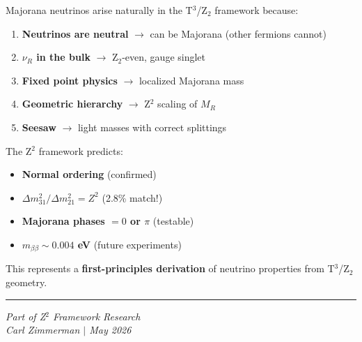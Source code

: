 \documentclass[12pt,a4paper]{article}
\begin{document}
Majorana neutrinos arise naturally in the T$^3$/Z$_2$ framework because:

\begin{enumerate}
\item \textbf{Neutrinos are neutral} $\rightarrow$ can be Majorana (other fermions cannot)
\item \textbf{$\nu_R$ in the bulk} $\rightarrow$ Z$_2$-even, gauge singlet
\item \textbf{Fixed point physics} $\rightarrow$ localized Majorana mass
\item \textbf{Geometric hierarchy} $\rightarrow$ Z$^2$ scaling of $M_R$
\item \textbf{Seesaw} $\rightarrow$ light masses with correct splittings
\end{enumerate}

The Z$^2$ framework predicts:
\begin{itemize}
\item \textbf{Normal ordering} (confirmed)
\item \textbf{$\Delta m^2_{31}/\Delta m^2_{21} = Z^2$} (2.8\% match!)
\item \textbf{Majorana phases $= 0$ or $\pi$} (testable)
\item \textbf{$m_{\beta\beta} \sim 0.004$ eV} (future experiments)
\end{itemize}

This represents a \textbf{first-principles derivation} of neutrino properties from T$^3$/Z$_2$ geometry.

\vspace{1cm}
\hrule
\vspace{0.5cm}
\textit{Part of Z$^2$ Framework Research}\\
\textit{Carl Zimmerman $|$ May 2026}
\end{document}

